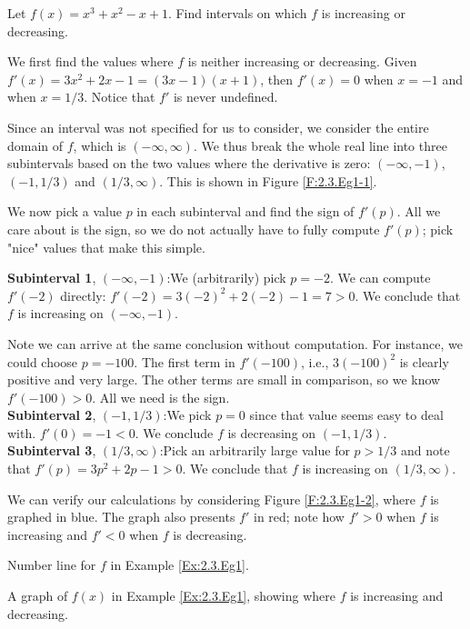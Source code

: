 \begin{example} \label{Ex:2.3.Eg1}
Let $f(x) = x^3+x^2-x+1$. Find intervals on which $f$ is increasing or decreasing.

\solution We first find the values where $f$ is neither increasing or decreasing. Given $f'(x) = 3x^2+2x-1 = (3x-1)(x+1)$, then  $f'(x) = 0$ when $x=-1$ and when $x=1/3$. Notice that $f'$ is never undefined.

Since an interval was not specified for us to consider, we consider the entire domain of $f$, which is $(-\infty,\infty)$. We thus break the whole real line into three subintervals based on the two values where the derivative is zero: $(-\infty,-1)$, $(-1,1/3)$ and $(1/3,\infty)$. This is shown in Figure \ref{F:2.3.Eg1-1}.

We now pick a value $p$ in each subinterval and find the sign of $f'(p)$. All we care about is the sign, so we do not actually have to fully compute $f'(p)$; pick "nice" values that make this simple.

\noindent\textbf{Subinterval 1}, $(-\infty,-1)$:\quad We (arbitrarily) pick $p=-2$. We can compute $f'(-2)$ directly: $f'(-2) = 3(-2)^2+2(-2)-1=7>0$. We conclude that $f$ is increasing on $(-\infty,-1)$.

Note we can arrive at the same conclusion without computation. For instance, we could choose $p=-100$. The first term in $f'(-100)$, i.e., $3(-100)^2$ is clearly positive and very large. The other terms are small in comparison, so we know $f'(-100)>0$. All we need is the sign.\\

\noindent\textbf{Subinterval 2}, $(-1,1/3)$:\quad We pick $p=0$ since that value seems easy to deal with. $f'(0) = -1<0$. We conclude $f$ is decreasing on $(-1,1/3)$.\\

\noindent\textbf{Subinterval 3}, $(1/3,\infty)$:\quad Pick an arbitrarily large value for $p>1/3$ and note that $f'(p) =3p^2+2p-1 >0$. We conclude that $f$ is increasing on $(1/3,\infty)$.

We can verify our calculations by considering Figure \ref{F:2.3.Eg1-2}, where $f$ is graphed in blue. The graph also presents $f'$ in red; note how $f'>0$ when $f$ is increasing and $f'<0$ when $f$ is decreasing.
\end{example}

\begin{marginfigure}[-15cm]
\caption{Number line for $f$ in Example \ref{Ex:2.3.Eg1}.}\label{F:2.3.Eg1-1}
\end{marginfigure}

\begin{marginfigure}[-6cm]
\caption{A graph of $f(x)$ in Example \ref{Ex:2.3.Eg1}, showing where $f$ is increasing and decreasing.}\label{F:2.3.Eg1-2}
\end{marginfigure}